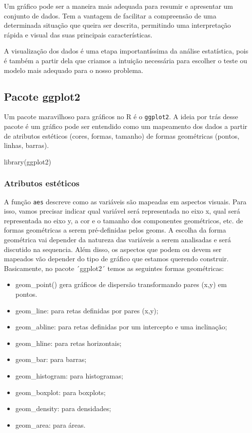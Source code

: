 \documentclass[
  letterpaper,
  DIV=11,
  numbers=noendperiod]{scrreprt}
\newenvironment{Shaded}{\begin{snugshade}}{\end{snugshade}}
\newcommand{\FunctionTok}[1]{\textcolor[rgb]{0.28,0.35,0.67}{#1}}
\newcommand{\NormalTok}[1]{\textcolor[rgb]{0.00,0.23,0.31}{#1}}
\begin{document}
Um gráfico pode ser a maneira mais adequada para resumir e apresentar um
conjunto de dados. Tem a vantagem de facilitar a compreensão de uma
determinada situação que queira ser descrita, permitindo uma
interpretação rápida e visual das suas principais características.

A visualização dos dados é uma etapa importantíssima da análise
estatística, pois é também a partir dela que criamos a intuição
necessária para escolher o teste ou modelo mais adequado para o nosso
problema.

\hypertarget{pacote-ggplot2}{%
\subsection{Pacote ggplot2}\label{pacote-ggplot2}}

Um pacote maravilhoso para gráficos no R é o \texttt{ggplot2}. A ideia
por trás desse pacote é um gráfico pode ser entendido como um mapeamento
dos dados a partir de atributos estéticos (cores, formas, tamanho) de
formas geométricas (pontos, linhas, barras).

\begin{Shaded}
\begin{Highlighting}[]
\FunctionTok{library}\NormalTok{(ggplot2)}
\end{Highlighting}
\end{Shaded}

\hypertarget{atributos-estuxe9ticos}{%
\subsubsection{Atributos estéticos}\label{atributos-estuxe9ticos}}

A função \texttt{aes} descreve como as variáveis são mapeadas em
aspectos visuais. Para isso, vamos precisar indicar qual variável será
representada no eixo x, qual será representada no eixo y, a cor e o
tamanho dos componentes geométricos, etc. de formas geométricas a serem
pré-definidas pelos geoms. A escolha da forma geométrica vai depender da
natureza das variáveis a serem analisadas e será discutido na sequencia.
Além disso, os aspectos que podem ou devem ser mapeados vão depender do
tipo de gráfico que estamos querendo construir. Basicamente, no pacote
´ggplot2´ temos as seguintes formas geométricas:

\begin{itemize}
\item
  geom\_point() gera gráficos de dispersão transformando pares (x,y) em
  pontos.
\item
  geom\_line: para retas definidas por pares (x,y);
\item
  geom\_abline: para retas definidas por um intercepto e uma inclinação;
\item
  geom\_hline: para retas horizontais;
\item
  geom\_bar: para barras;
\item
  geom\_histogram: para histogramas;
\item
  geom\_boxplot: para boxplots;
\item
  geom\_density: para densidades;
\item
  geom\_area: para áreas.
\end{itemize}
\end{document}
